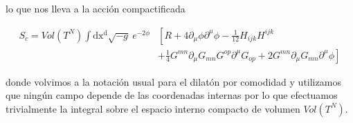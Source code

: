 \documentclass{article}
\numberwithin{equation}{section}
\begin{document}
lo que nos lleva a la acción compactificada\\

\begin{boxquation}
	\begin{equation}\label{S_determinante}
	\begin{aligned}
	S_c =Vol\left(T^N\right) \int\mathrm{dx^d} \sqrt{-g} \ e^{-2\phi}&\left[R + 4 \partial_{\mu}\phi\partial^{\mu} \phi   - \frac{1}{12} H_{i j k}H^{i j k} \right.\\
	&\left.+ \frac{1}{4} G^{m n} \partial_{\mu}{G_{m n}} G^{o p} \partial^{\mu}{G_{o p}} + 2 G^{m n} \partial_{\mu}G_{m n} \partial^{\mu} \phi \right]
	\end{aligned}
	\end{equation}
\end{boxquation}

donde volvimos a la notación usual para el dilatón por comodidad y utilizamos que ningún campo depende de las coordenadas internas por lo que efectuamos trivialmente la integral sobre el espacio interno compacto de volumen $ Vol\left(T^N\right) $.\\

%
%
\end{document}
